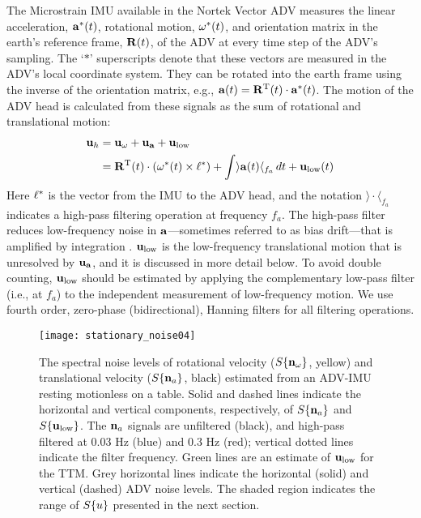 The Microstrain IMU available in the Nortek Vector ADV measures the linear acceleration, ${\mathbf{a}}^*(t)$, rotational motion, $\mathbf{\omega}^*(t)$, and orientation matrix in the earth's reference frame, $\mathbf{R}(t)$, of the ADV at every time step of the ADV's sampling. The `$*$' superscripts denote that these vectors are measured in the ADV's local coordinate system. They can be rotated into the earth frame using the inverse of the orientation matrix, e.g., ${\mathbf{a}}(t) = \mathbf{R}^\mathrm{T}(t)\cdot {\ensuremath{\mathbf{a}}}^*(t)$. The motion of the ADV head is calculated from these signals as the sum of rotational and translational motion:
\begin{align}
  \label{eqn:uhead}
\begin{split}
  \mathbf{u}_{h} & = \mathbf{u}_\mathbf{\omega} + \mathbf{u}_\mathbf{a} + \mathbf{u}_\mathrm{low} \\
      & = \mathbf{R}^\mathrm{T}(t) \cdot (\mathbf{\omega}^*(t)\times\mathbf{\ell}^*) + \int \rangle {\ensuremath{\mathbf{a}}}(t)\langle_{f_{a}} \,dt + \mathbf{u}_\mathrm{low}(t)
\end{split}
\end{align}
Here $\mathbf{\ell}^*$ is the vector from the IMU to the ADV head, and the notation $\rangle \cdot \langle _{f_a}$ indicates a high-pass filtering operation at frequency $f_a$. The high-pass filter reduces low-frequency noise in ${\mathbf{a}}$---sometimes referred to as bias drift---that is amplified by integration \cite[]{Barshan+Whyte1995, Bevly2004, Gulmammadov2009}. $\mathbf{u}_\mathrm{low}$ is the low-frequency translational motion that is unresolved by $\mathbf{u}_\mathbf{a}$, and it is discussed in more detail below. To avoid double counting, $\mathbf{u}_\mathrm{low}$ should be estimated by applying the complementary low-pass filter (i.e., at $f_a$) to the independent measurement of low-frequency motion. We use fourth order, zero-phase (bidirectional), Hanning filters for all filtering operations.

\begin{figure}
  \centering
  \texttt{[image: stationary\_noise04]}
  \caption{The spectral noise levels of rotational velocity ($S\{\mathbf{n}_{\omega}\}$, yellow) and translational velocity ($S\{\mathbf{n}_{a}\}$, black) estimated from an ADV-IMU resting motionless on a table. Solid and dashed lines indicate the horizontal and vertical components, respectively, of $S\{\mathbf{n}_{a}\}$ and $S\{\mathbf{u}_\mathrm{low}\}$. The $\mathbf{n}_{a}$ signals are unfiltered (black), and high-pass filtered at 0.03 Hz (blue) and 0.3 Hz (red); vertical dotted lines indicate the filter frequency.  Green lines are an estimate of $\mathbf{u}_\mathrm{low}$ for the TTM. Grey horizontal lines indicate the horizontal (solid) and vertical (dashed) ADV noise levels. The shaded region indicates the range of $S\{u\}$ presented in the next section.}
  \label{fig:stnoise}
\end{figure}

